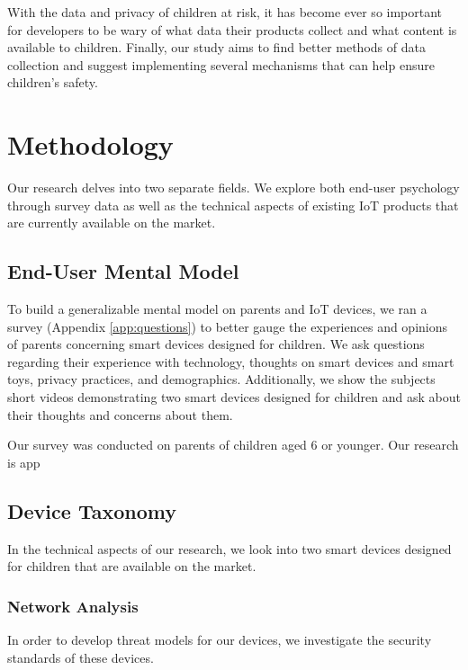 \documentclass[12pt]{ucthesis}
\begin{document}
With the data and privacy of children at risk, it has become ever so important for developers to be wary of what data their products collect and what content is available to children. Finally, our study aims to find better methods of data collection and suggest implementing several mechanisms that can help ensure children's safety. 

\chapter{Methodology}
\label{ch:methodology}
Our research delves into two separate fields. We explore both end-user psychology through survey data as well as the technical aspects of existing IoT products that are currently available on the market.

\section{End-User Mental Model}
To build a generalizable mental model on parents and IoT devices, we ran a survey (Appendix \ref{app:questions}) to better gauge the experiences and opinions of parents concerning smart devices designed for children. We ask questions regarding their experience with technology, thoughts on smart devices and smart toys, privacy practices, and demographics. Additionally, we show the subjects short videos demonstrating two smart devices designed for children and ask about their thoughts and concerns about them.

Our survey was conducted on parents of children aged 6 or younger. Our research is app

\section{Device Taxonomy}
In the technical aspects of our research, we look into two smart devices designed for children that are available on the market. 

\subsection{Network Analysis}
In order to develop threat models for our devices, we investigate the security standards of these devices. 

\subsection{}
\end{document}
